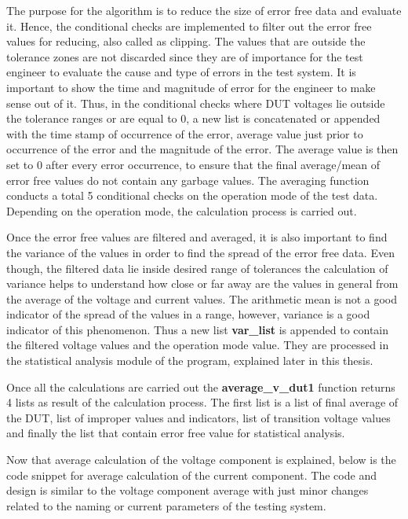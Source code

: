 The purpose for the algorithm is to reduce the size of error free data and evaluate it. Hence, the conditional checks are implemented to filter out the error free values for reducing, also called as clipping. The values that are outside the tolerance zones are not discarded since they are of importance for the test engineer to evaluate the cause and type of errors in the test system. It is important to show the time and magnitude of error for the engineer to make sense out of it. Thus, in the conditional checks where DUT voltages lie outside the tolerance ranges or are equal to 0, a new list is concatenated or appended with the time stamp of occurrence of the error, average value just prior to occurrence of the error and the magnitude of the error. The average value is then set to 0 after every error occurrence, to ensure that the final average/mean of error free values do not contain any garbage values. The averaging function conducts a total 5 conditional checks on the operation mode of the test data. Depending on the operation mode, the calculation process is carried out. 

Once the error free values are filtered and averaged, it is also important to find the variance of the values in order to find the spread of the error free data. Even though, the filtered data lie inside desired range of tolerances the calculation of variance helps to understand how close or far away are the values in general from the average of the voltage and current values. The arithmetic mean is not a good indicator of the spread of the values in a range, however, variance is a good indicator of this phenomenon. Thus a new list \textbf{var\_list} is appended to contain the filtered voltage values and the operation mode value. They are processed in the statistical analysis module of the program, explained later in this thesis. 

Once all the calculations are carried out the \textbf{average\_v\_dut1} function returns 4 lists as result of the calculation process. The first list is a list of final average of the DUT, list of improper values and indicators, list of transition voltage values and finally the list that contain error free value for statistical analysis.

Now that average calculation of the voltage component is explained, below is the code snippet for average calculation of the current component. The code and design is similar to the voltage component average with just minor changes related to the naming or current parameters of the testing system.\\

